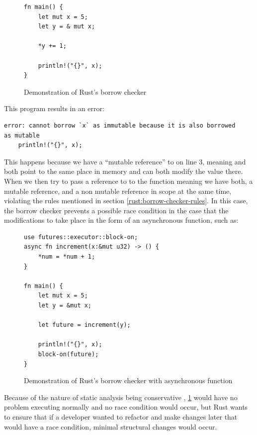 \documentclass[a4paper]{article}
\begin{document}
\begin{figure}[H]\label{fig:code:borrow-checker-1}
	\begin{lstlisting}
fn main() {
    let mut x = 5;
    let y = & mut x;

    *y += 1;

    println!("{}", x);
}
 	\end{lstlisting}
	\caption{Demonstration of Rust's borrow checker}
\end{figure}
This program results in an error:
\begin{verbatim}
error: cannot borrow `x` as immutable because it is also borrowed
as mutable
    println!("{}", x);
\end{verbatim}
This happens because we have a ``mutable reference'' to  on line 3, meaning  and  both point to the same place in memory and can both modify the value there. When we then try to pass a reference to  to the  function meaning we have both, a mutable reference, and a non mutable reference in scope at the same time, violating the rules mentioned in section \ref{rust:borrow-checker-rules}. In this case, the borrow checker prevents a possible race condition in the case that the modifications to  take place in the form of an asynchronous function, such as:
\begin{figure}[H]
	\begin{lstlisting}
use futures::executor::block-on;
async fn increment(x:&mut u32) -> () {
	*num = *num + 1;
}

fn main() {
    let mut x = 5;
    let y = &mut x;

    let future = increment(y);

    println!("{}", x);
    block-on(future);
}
 	\end{lstlisting}
	\caption{Demonstration of Rust's borrow checker with asynchronous function}
\end{figure}
Because of the nature of static analysis being conservative \parencite{ernst-2003-static}, \ref{fig:code:borrow-checker-1} would have no problem executing normally and no race condition would occur, but Rust wants to ensure that if a developer wanted to refactor and make changes later that would have a race condition, minimal structural changes would occur.
\end{document}
